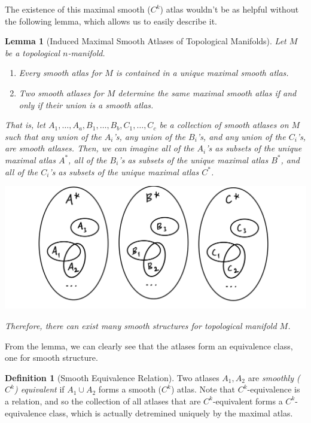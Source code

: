 \documentclass{article}
\newtheorem{lemma}[theorem]{Lemma}
\theoremstyle{remark}
\theoremstyle{definition}
\newtheorem{definition}{Definition}[section]
\begin{document}
The existence of this maximal smooth ($C^k$) atlas wouldn't be as helpful without the following lemma, which allows us to easily describe it. 

\begin{lemma}[Induced Maximal Smooth Atlases of Topological Manifolds]
Let $M$ be a topological $n$-manifold. 
\begin{enumerate}
    \item Every smooth atlas for $M$ is contained in a unique maximal smooth atlas. 
    \item Two smooth atlases for $M$ determine the same maximal smooth atlas if and only if their union is a smooth atlas. 
\end{enumerate}
That is, let $A_1, \ldots, A_a, B_1, \ldots, B_b, C_1, \ldots, C_c$ be a collection of smooth atlases on $M$ such that any union of the $A_i$'s, any union of the $B_i$'s, and any union of the $C_i$'s, are smooth atlases. Then, we can imagine all of the $A_i$'s as subsets of the unique maximal atlas $A^*$, all of the $B_i$'s as subsets of the unique maximal atlas $B^*$, and all of the $C_i$'s as subsets of the unique maximal atlas $C^*$. 
\begin{center}
    \includegraphics[scale=0.25]{img/Maximal_Smooth_Atlas_Classes.PNG}
\end{center}
Therefore, there can exist many smooth structures for topological manifold $M$. 
\end{lemma}

From the lemma, we can clearly see that the atlases form an equivalence class, one for smooth structure. 

\begin{definition}[Smooth Equivalence Relation]
Two atlases $A_1, A_2$ are \textit{smoothly ($C^k$) equivalent} if $A_1 \cup A_2$ forms a smooth ($C^k$) atlas. Note that $C^k$-equivalence is a relation, and so the collection of all atlases that are $C^k$-equivalent forms a $C^k$-equivalence class, which is actually detremined uniquely by the maximal atlas. 
\end{definition}
\end{document}
